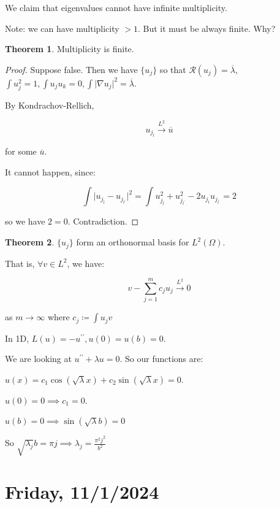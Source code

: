 \documentclass{article}
\theoremstyle{definition}
\newtheorem{theorem}{Theorem}
\begin{document}
We claim that eigenvalues cannot have infinite multiplicity.

Note: we can have multiplicity \(> 1\). But it must be always finite. Why?

\begin{theorem}
    Multiplicity is finite.
\end{theorem}

\begin{proof}
    Suppose false. Then we have \(\{ u_j \} \) so that \(\mathcal{R} (u_j) = \overline{\lambda}\), \(\int u_j^2 = 1, \int u_j u_k = 0, \int \vert \nabla u_j \vert ^ 2 = \overline{\lambda}\).

    By Kondrachov-Rellich,

    \[
        u_{j_l} \overset{L^2}{\to} \overline{u}  
    \]

    for some \(\overline{u}\).

    It cannot happen, since:

    \[
        \int \vert u_{j_l} - u_{j_{l^{\prime}}} \vert ^2 = \int u_{j_l} ^2 + u_{j_{l^{\prime}}} ^2 - 2 u_{j_l} u_{j_{l^{\prime}}} = 2
    \]

    so we have \(2 = 0\). Contradiction.

\end{proof}

\begin{theorem}
    \(\{ u_j \}\) form an orthonormal basis for \(L^2(\Omega)\).
\end{theorem}

That is, \(\forall v \in L^2\), we have:

\[
    v - \sum_{j=1}^m c_j u_j \overset{L^2}{\to} 0
\]

as \(m \to \infty\) where \(c_j \coloneqq \int u_j v\)  

In 1D, \(L(u) = -u^{\prime\prime}, u(0) = u(b) = 0\).

We are looking at \(u^{\prime\prime} + \lambda u = 0\). So our functions are:

\(u(x) = c_1 \cos (\sqrt{\lambda} x) + c_2 \sin (\sqrt{\lambda} x) = 0\).

\(u(0) = 0 \implies c_1 = 0\).

\(u(b) = 0 \implies \sin(\sqrt{\lambda} b) = 0\)

So \(\sqrt{\lambda_j} b = \pi j \implies \lambda_j = \frac{\pi^2 j^2}{b^2}\) 

\section*{Friday, 11/1/2024}
\end{document}
